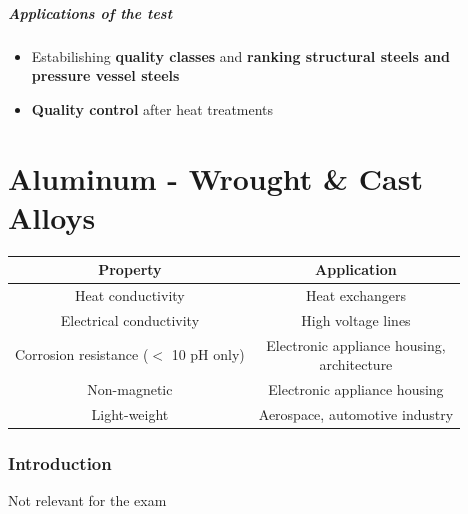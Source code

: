 \documentclass{article}
\begin{document}
\subsubsection{Applications of the test}
\begin{itemize}
  \item Estabilishing \textbf{quality classes} and \textbf{ranking structural steels and pressure vessel steels}
  \item \textbf{Quality control} after heat treatments
\end{itemize}

\newpage
\part{Aluminum - Wrought \& Cast Alloys}
\begin{center}
  \begin{tabular}{|c|c|}
    \hline
    \textbf{Property} & \textbf{Application}\\
    \hline
    Heat conductivity & Heat exchangers\\
    \hline
    Electrical conductivity & High voltage lines\\
    \hline
    Corrosion resistance ($<$ 10 pH only) & \makecell{Electronic appliance housing,\\ architecture}\\
    \hline
    Non-magnetic & Electronic appliance housing\\
    \hline
    Light-weight & Aerospace, automotive industry\\
    \hline
  \end{tabular}
\end{center}

\section{Introduction}
Not relevant for the exam
\end{document}
